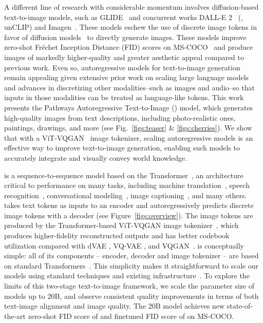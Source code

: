 A different line of research with considerable momentum involves diffusion-based text-to-image models, such as GLIDE~\cite{nichol2021glide} and concurrent works DALL-E 2~\cite{ramesh2022hierarchical} (\aka, unCLIP) and Imagen~\cite{imagen}. These models eschew the use of discrete image tokens in favor of diffusion models~\cite{ho2020denoising, dhariwal2021diffusion} to directly generate images. These models improve zero-shot Fr\'echet Inception Distance (FID) scores on MS-COCO~\cite{lin2014microsoft} and produce images of markedly higher-quality and greater aesthetic appeal compared to previous work. Even so, autoregressive models for text-to-image generation remain appealing given extensive prior work on scaling large language models~\cite{gpt3, lamda, du2021glam, palm} and advances in discretizing other modalities--such as images and audio--so that inputs in those modalities can be treated as language-like tokens. This work presents the Pathways Autoregressive Text-to-Image (\textit{\bdraw}) model, which generates high-quality images from text descriptions, including photo-realistic ones, paintings, drawings, and more (see Fig.\ \ref{figs:teaser} \& \ref{figs:cherries}). We show that with a ViT-VQGAN~\cite{yu2021vector} image tokenizer, scaling autoregressive models is an effective way to improve text-to-image generation, enabling such models to accurately integrate and visually convey world knowledge.

\bdraw is a sequence-to-sequence model based on the Transformer~\cite{vaswani2017attention}, an architecture critical to performance on many tasks, including machine translation~\cite{vaswani2017attention}, speech recognition~\cite{zhang2020transformer, gulati2020conformer}, conversational modeling~\cite{meena}, image captioning~\cite{yu2022coca}, and many others. \bdraw takes text tokens as inputs to an encoder and autoregressively predicts discrete image tokens with a decoder (see Figure~\ref{figs:overview}).
The image tokens are produced by the Transformer-based ViT-VQGAN image tokenizer~\cite{yu2021vector}, which produces higher-fidelity reconstructed outputs and has better codebook utilization compared with dVAE \cite{rolfe2016discrete}, VQ-VAE \cite{van2017neural}, and VQGAN~\cite{Esser21vqgan}. \bdraw is conceptually simple: all of its components -- encoder, decoder and image tokenizer -- are based on standard Transformers~\cite{vaswani2017attention}. This simplicity makes it straightforward to scale our models using standard techniques and existing infrastructure~\cite{megatron, du2021glam, palm, xu2021gspmd}. To explore the limits of this two-stage text-to-image framework, we scale the parameter size of \bdraw models up to 20B, and observe consistent quality improvements in terms of both text-image alignment and image quality. The 20B \bdraw model achieves new state-of-the-art zero-shot FID score of \fid{} and finetuned FID score of \fidft{} on MS-COCO.

